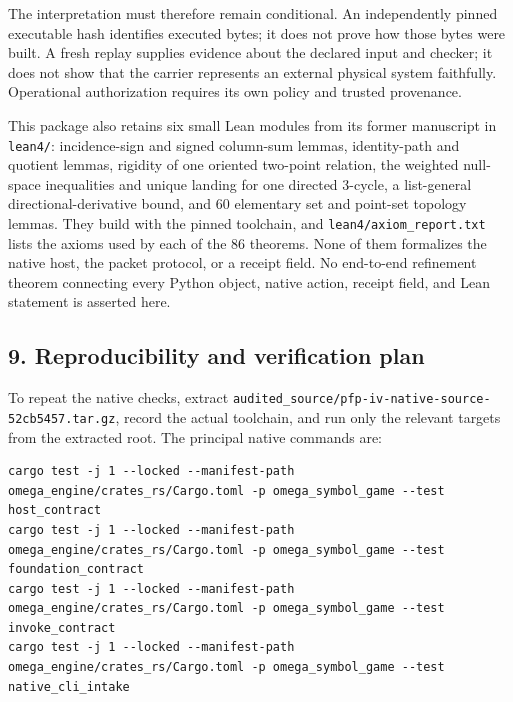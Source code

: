 \documentclass[
  11pt,
]{article}
\newcommand{\passthrough}[1]{#1}
\begin{document}
The interpretation must therefore remain conditional. An independently
pinned executable hash identifies executed bytes; it does not prove how
those bytes were built. A fresh replay supplies evidence about the
declared input and checker; it does not show that the carrier represents
an external physical system faithfully. Operational authorization
requires its own policy and trusted provenance.

This package also retains six small Lean modules from its former
manuscript in \passthrough{\lstinline!lean4/!}: incidence-sign and
signed column-sum lemmas, identity-path and quotient lemmas, rigidity of
one oriented two-point relation, the weighted null-space inequalities
and unique landing for one directed 3-cycle, a list-general
directional-derivative bound, and 60 elementary set and point-set
topology lemmas. They build with the pinned toolchain, and
\nolinkurl{lean4/axiom_report.txt} lists the axioms used by each of the
86 theorems. None of them formalizes the native host, the packet
protocol, or a receipt field. No end-to-end refinement theorem
connecting every Python object, native action, receipt field, and Lean
statement is asserted here.

\subsection{9. Reproducibility and verification
plan}\label{reproducibility-and-verification-plan}

To repeat the native checks, extract
\nolinkurl{audited_source/pfp-iv-native-source-52cb5457.tar.gz}, record
the actual toolchain, and run only the relevant targets from the
extracted root. The principal native commands are:

\begin{lstlisting}
cargo test -j 1 --locked --manifest-path omega_engine/crates_rs/Cargo.toml -p omega_symbol_game --test host_contract
cargo test -j 1 --locked --manifest-path omega_engine/crates_rs/Cargo.toml -p omega_symbol_game --test foundation_contract
cargo test -j 1 --locked --manifest-path omega_engine/crates_rs/Cargo.toml -p omega_symbol_game --test invoke_contract
cargo test -j 1 --locked --manifest-path omega_engine/crates_rs/Cargo.toml -p omega_symbol_game --test native_cli_intake
\end{lstlisting}
\end{document}

